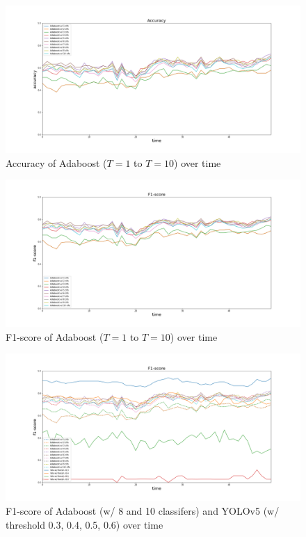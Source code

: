\documentclass{article}[12pt, twocolumn]
\begin{document}
\begin{figure}[H]
    \centering
    \includegraphics[width=\textwidth]{figure/Accuracy_Adaboost.png}
    \caption{Accuracy of Adaboost ($T=1$ to $T=10$) over time}
    \label{fig:acc_ada}
\end{figure}

\begin{figure}[H]
    \centering
    \includegraphics[width=\textwidth]{figure/F1-score_Adaboost.png}
    \caption{F1-score of Adaboost ($T=1$ to $T=10$) over time}
    \label{fig:f1_ada}
\end{figure}

\begin{figure}[H]
    \centering
    \includegraphics[width=\textwidth]{figure/F1-score.png}
    \caption{F1-score of Adaboost (w/ 8 and 10 classifers)
    and YOLOv5 (w/ threshold 0.3, 0.4, 0.5, 0.6) over time}
    \label{fig:F1}
\end{figure}
\end{document}
